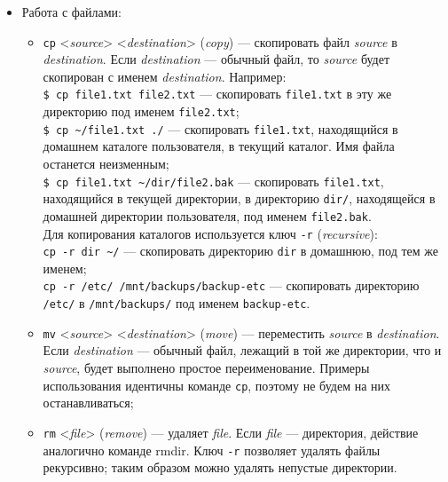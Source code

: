 \begin{itemize}
\begin{itemize}
  \end{itemize}
 \item Работа с файлами:
  \begin{itemize}
   \item \texttt{cp} <\emph{source}> <\emph{destination}> (\emph{copy}) --- скопировать файл \emph{source} в \emph{destination}. Если \emph{destination} --- обычный файл, то \emph{source} будет скопирован с именем \emph{destination}. Например:\\
    \texttt{\$ cp file1.txt file2.txt} --- скопировать \texttt{file1.txt} в эту же директорию под именем \texttt{file2.txt};\\
    \texttt{\$ cp \~{}/file1.txt ./} --- скопировать \texttt{file1.txt}, находящийся в домашнем каталоге пользователя, в текущий каталог. Имя файла останется неизменным;\\
    \texttt{\$ cp file1.txt \~{}/dir/file2.bak} --- скопировать \texttt{file1.txt}, находящийся в текущей директории, в директорию \texttt{dir/}, находящейся в домашней директории пользователя, под именем \texttt{file2.bak}.\\
   Для копирования каталогов используется ключ \texttt{-r} (\emph{recursive}):\\
    \texttt{cp -r dir \~{}/} --- скопировать директорию \texttt{dir} в домашнюю, под тем же именем;\\
    \texttt{cp -r /etc/ /mnt/backups/backup-etc} --- скопировать директорию \texttt{/etc/} в \texttt{/mnt/backups/} под именем \texttt{backup-etc}.
   \item \texttt{mv} <\emph{source}> <\emph{destination}> (\emph{move}) --- переместить \emph{source} в \emph{des\-ti\-na\-ti\-on}. Если \emph{destination} --- обычный файл, лежащий в той же директории, что и \emph{source}, будет выполнено простое переименование. Примеры использования идентичны команде \texttt{cp}, поэтому не будем на них останавливаться;
   \item \texttt{rm} <\emph{file}> (\emph{remove}) --- удаляет \emph{file}. Если \emph{file} --- директория, действие аналогично команде rmdir. Ключ \texttt{-r} позволяет удалять файлы рекурсивно; таким образом можно удалять непустые директории.
  \end{itemize}
\end{itemize}

